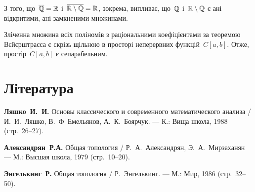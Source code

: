 З того, що~$\overline{\mathbb{Q}} = \mathbb{R}$ і~$\overline{\mathbb{R} \setminus \mathbb{Q}} = \mathbb{R}$, зокрема, випливає, що~$\mathbb{Q}$ і~$\mathbb{R} \setminus \mathbb{Q}$ є ані відкритими, ані замкненими множинами.

\begin{example}
    Зліченна множина всіх поліномів з раціональними коефіцієнтами за теоремою Вєйєрштрасса є скрізь щільною в просторі неперервних функцій~$C[a, b]$. Отже, простір~$C[a, b]$ є сепарабельним.
\end{example}

\section{Література}

\begin{enumerate}[label={[\arabic*]}]
\item \textbf{Ляшко~И.~И.}
Основы классического и современного математического анализа /
И.~И.~Ляшко, В.~Ф~Емельянов, А.~К.~Боярчук. ---
К.: Вища школа, 1988 (стр.~26--27).
\item \textbf{Александрян~Р.А.}
Общая топология /
Р.~А.~Александрян, Э.~А.~Мирзаханян ---
М.: Высшая школа, 1979 (стр.~10--20).
\item \textbf{Энгелькинг~Р.}
Общая топология /
Р.~Энгелькинг. ---
М.: Мир, 1986 (стр.~32--50).
\end{enumerate}

